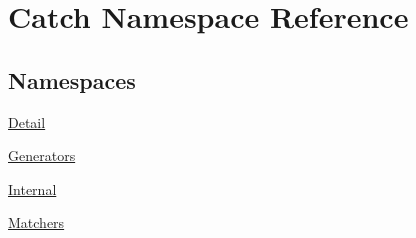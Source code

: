 \hypertarget{namespace_catch}{\section{Catch Namespace Reference}
\label{namespace_catch}
}
\subsection*{Namespaces}
\begin{DoxyCompactItemize}
\item 
\hyperlink{namespace_catch_1_1_detail}{Detail}
\item 
\hyperlink{namespace_catch_1_1_generators}{Generators}
\item 
\hyperlink{namespace_catch_1_1_internal}{Internal}
\item 
\hyperlink{namespace_catch_1_1_matchers}{Matchers}
\end{DoxyCompactItemize}
